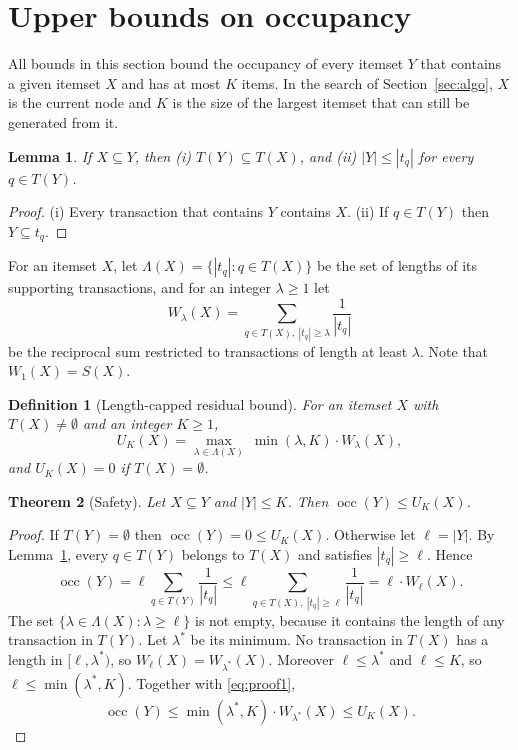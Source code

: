 \documentclass[pdflatex,sn-mathphys,Numbered]{sn-jnl}
\theoremstyle{thmstyleone}
\newtheorem{theorem}{Theorem}
\newtheorem{lemma}[theorem]{Lemma}
\theoremstyle{thmstyletwo}
\theoremstyle{thmstylethree}
\newtheorem{definition}{Definition}
\newcommand{\socc}{\operatorname{occ}}
\newcommand{\Ucap}{U}
\begin{document}
\section{Upper bounds on occupancy}\label{sec:bounds}

All bounds in this section bound the occupancy of every itemset $Y$ that contains a given itemset $X$ and has at most $K$ items. In the search of Section~\ref{sec:algo}, $X$ is the current node and $K$ is the size of the largest itemset that can still be generated from it.

\begin{lemma}\label{lem:basic}
If $X \subseteq Y$, then (i) $T(Y) \subseteq T(X)$, and (ii) $|Y| \le |t_q|$ for every $q \in T(Y)$.
\end{lemma}
\begin{proof}
(i) Every transaction that contains $Y$ contains $X$. (ii) If $q \in T(Y)$ then $Y \subseteq t_q$.
\end{proof}

For an itemset $X$, let $\Lambda(X) = \{ |t_q| : q \in T(X) \}$ be the set of lengths of its supporting transactions, and for an integer $\lambda \ge 1$ let
\begin{equation}
W_\lambda(X) = \sum_{q \in T(X),\ |t_q| \ge \lambda} \frac{1}{|t_q|}
\end{equation}
be the reciprocal sum restricted to transactions of length at least $\lambda$. Note that $W_1(X) = S(X)$.

\begin{definition}[Length-capped residual bound]\label{def:capped}
For an itemset $X$ with $T(X) \ne \emptyset$ and an integer $K \ge 1$,
\begin{equation}\label{eq:capped}
\Ucap_K(X) = \max_{\lambda \in \Lambda(X)} \ \min(\lambda, K) \cdot W_\lambda(X),
\end{equation}
and $\Ucap_K(X) = 0$ if $T(X) = \emptyset$.
\end{definition}

\begin{theorem}[Safety]\label{thm:capped}
Let $X \subseteq Y$ and $|Y| \le K$. Then $\socc(Y) \le \Ucap_K(X)$.
\end{theorem}
\begin{proof}
If $T(Y) = \emptyset$ then $\socc(Y) = 0 \le \Ucap_K(X)$. Otherwise let $\ell = |Y|$. By Lemma~\ref{lem:basic}, every $q \in T(Y)$ belongs to $T(X)$ and satisfies $|t_q| \ge \ell$. Hence
\begin{equation}\label{eq:proof1}
\socc(Y) = \ell \sum_{q \in T(Y)} \frac{1}{|t_q|} \le \ell \sum_{q \in T(X),\ |t_q| \ge \ell} \frac{1}{|t_q|} = \ell \cdot W_\ell(X).
\end{equation}
The set $\{\lambda \in \Lambda(X) : \lambda \ge \ell\}$ is not empty, because it contains the length of any transaction in $T(Y)$. Let $\lambda^*$ be its minimum. No transaction in $T(X)$ has a length in $[\ell, \lambda^*)$, so $W_\ell(X) = W_{\lambda^*}(X)$. Moreover $\ell \le \lambda^*$ and $\ell \le K$, so $\ell \le \min(\lambda^*, K)$. Together with \eqref{eq:proof1},
\[
\socc(Y) \le \min(\lambda^*, K) \cdot W_{\lambda^*}(X) \le \Ucap_K(X).
\]
\end{proof}
\end{document}
